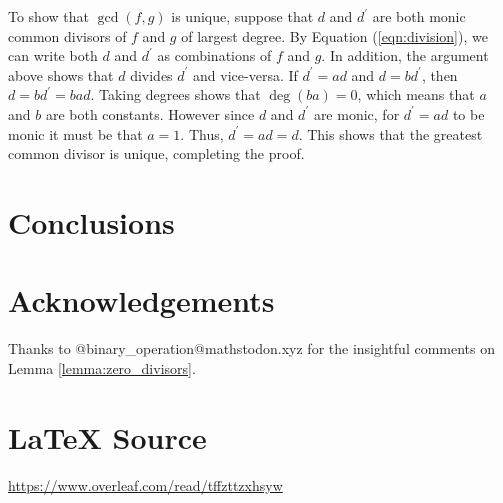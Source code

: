 \documentclass{article}
\theoremstyle{definition}
\begin{document}
\bigskip
\noindent
To show that $\gcd(f,g)$ is unique, suppose that $d$ and
$d^\prime$ are both monic common divisors of $f$ and $g$ of
largest degree.  By Equation (\ref{eqn:division}), we can write
both $d$ and $d^\prime$ as combinations of $f$ and $g$. In
addition, the argument above shows that $d$ divides $d^\prime$
and vice-versa. If $d^\prime = ad$ and $d = bd^\prime$, then $d =
bd^\prime = bad$. Taking degrees shows that $\deg(ba) = 0$, which
means that $a$ and $b$ are both constants. However since $d$ and
$d^\prime$ are monic, for $d^\prime = ad$ to be monic it must be
that $a = 1$. Thus, $d^\prime = ad = d$.  This shows that the
greatest common divisor is unique, completing the proof. 
%
%
%
\section{Conclusions}
\label{sec:conclusions}
%
%
%
\section{Acknowledgements}
\label{sec:acknowledgements}
Thanks to @binary\_operation@mathstodon.xyz for 
the insightful comments on Lemma \ref{lemma:zero_divisors}.
%
%
\section*{\LaTeX \hspace{0.025 mm} Source}
\url{https://www.overleaf.com/read/tffzttzxhsyw}
%
%
%


%
%
\end{document}

